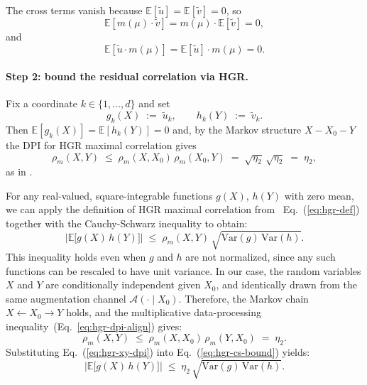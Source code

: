 \documentclass{article}
\newcommand{\E}{\mathbb{E}}
\newcommand{\Var}{\mathrm{Var}}
\renewcommand{\eqref}[1]{Eq.~(\ref{#1})}
\newcommand{\peqref}[1]{(Eq.~\ref{#1})}
\begin{document}
The cross terms vanish because $\E[\tilde u] = \E[\tilde v] = 0$, so
\begin{equation}
\label{eq:cross-vanish-1}
\E[m(\mu) \cdot \tilde v] = m(\mu) \cdot \E[\tilde v] = 0,
\end{equation}
and
\begin{equation}
\label{eq:cross-vanish-2}
\E[\tilde u \cdot m(\mu)] = \E[\tilde u] \cdot m(\mu) = 0.
\end{equation}


\paragraph{Step 2: bound the residual correlation via HGR.}
Fix a coordinate $k\in\{1,\dots,d\}$ and set
\begin{equation}
\label{eq:coord-fns}
g_k(X) \;:=\; \tilde u_k, 
\qquad 
h_k(Y) \;:=\; \tilde v_k .
\end{equation}
Then $\E[g_k(X)]=\E[h_k(Y)]=0$ and, by the Markov structure $X - X_0 - Y$\, the DPI for HGR maximal correlation gives
\begin{equation}
\label{eq:hgr-dpi-align}
\rho_m(X,Y)\;\le\;\rho_m(X,X_0)\,\rho_m(X_0,Y)
\;=\;\sqrt{\eta_2}\,\sqrt{\eta_2}
\;=\;\eta_2,
\end{equation}
as in \citet{anantharam2013maximal}.

\noindent
For any real-valued, square-integrable functions \( g(X) \), \( h(Y) \) with zero mean, we can apply the definition of HGR maximal correlation from ~\eqref{eq:hgr-def} together with the Cauchy-Schwarz inequality to obtain:
\begin{equation}
\label{eq:hgr-cs-bound}
\big|\E\big[g(X)\,h(Y)\big]\big|
\;\le\; \rho_m(X,Y)\,\sqrt{\Var(g)\,\Var(h)}.
\end{equation}
This inequality holds even when \( g \) and \( h \) are not normalized, since any such functions can be rescaled to have unit variance. In our case, the random variables \( X \) and \( Y \) are conditionally independent given \( X_0 \), and identically drawn from the same augmentation channel \( \mathcal A(\cdot\mid X_0) \). Therefore, the Markov chain \( X \leftarrow X_0 \rightarrow Y \) holds, and the multiplicative data-processing inequality~\peqref{eq:hgr-dpi-align} gives:
\begin{equation}
\label{eq:hgr-xy-dpi}
\rho_m(X,Y)\;\le\; \rho_m(X,X_0)\,\rho_m(Y,X_0) \;=\; \eta_2.
\end{equation}
Substituting \eqref{eq:hgr-xy-dpi} into \eqref{eq:hgr-cs-bound} yields:
\begin{equation}
\label{eq:hgr-final-bound}
\big|\E\big[g(X)\,h(Y)\big]\big|
\;\le\; \eta_2\,\sqrt{\Var(g)\,\Var(h)}.
\end{equation}
\end{document}
